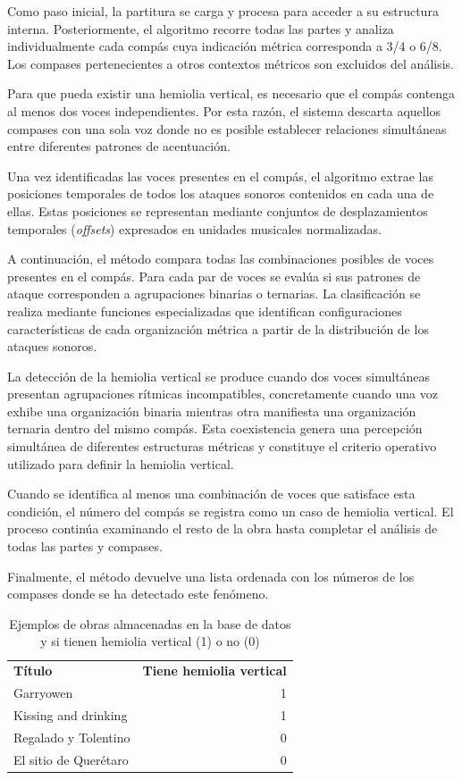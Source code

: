 Como paso inicial, la partitura se carga y procesa para acceder a su estructura interna. Posteriormente, el algoritmo recorre todas las partes y analiza individualmente cada compás cuya indicación métrica corresponda a 3/4 o 6/8. Los compases pertenecientes a otros contextos métricos son excluidos del análisis.

Para que pueda existir una hemiolia vertical, es necesario que el compás contenga al menos dos voces independientes. Por esta razón, el sistema descarta aquellos compases con una sola voz donde no es posible establecer relaciones simultáneas entre diferentes patrones de acentuación.

Una vez identificadas las voces presentes en el compás, el algoritmo extrae las posiciones temporales de todos los ataques sonoros contenidos en cada una de ellas. Estas posiciones se representan mediante conjuntos de desplazamientos temporales (\textit{offsets}) expresados en unidades musicales normalizadas.

A continuación, el método compara todas las combinaciones posibles de voces presentes en el compás. Para cada par de voces se evalúa si sus patrones de ataque corresponden a agrupaciones binarias o ternarias. La clasificación se realiza mediante funciones especializadas que identifican configuraciones características de cada organización métrica a partir de la distribución de los ataques sonoros.

La detección de la hemiolia vertical se produce cuando dos voces simultáneas presentan agrupaciones rítmicas incompatibles, concretamente cuando una voz exhibe una organización binaria mientras otra manifiesta una organización ternaria dentro del mismo compás. Esta coexistencia genera una percepción simultánea de diferentes estructuras métricas y constituye el criterio operativo utilizado para definir la hemiolia vertical.

Cuando se identifica al menos una combinación de voces que satisface esta condición, el número del compás se registra como un caso de hemiolia vertical. El proceso continúa examinando el resto de la obra hasta completar el análisis de todas las partes y compases.

Finalmente, el método devuelve una lista ordenada con los números de los compases donde se ha detectado este fenómeno.

\begin{table}[H]
\centering
\begin{tabular}{lr}
\textbf{Título} & \textbf{Tiene hemiolia vertical} \\
Garryowen & 1 \\
Kissing and drinking & 1 \\
Regalado y Tolentino & 0 \\
El sitio de Querétaro & 0 \\
\end{tabular}
\caption{Ejemplos de obras almacenadas en la base de datos y si tienen hemiolia vertical (1) o no (0)}
\end{table}

